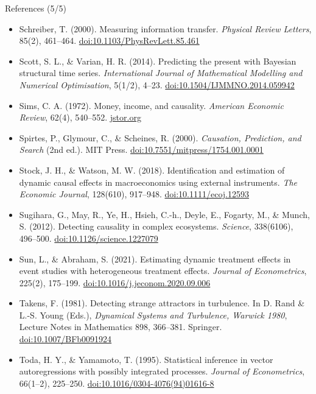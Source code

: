\begin{frame}{References (5/5)}
\itemsize{\tiny}
\begin{itemize}
    \item Schreiber, T. (2000). Measuring information transfer. \textit{Physical Review Letters}, 85(2), 461--464. \href{https://doi.org/10.1103/PhysRevLett.85.461}{doi:10.1103/PhysRevLett.85.461}
    \item Scott, S. L., \& Varian, H. R. (2014). Predicting the present with Bayesian structural time series. \textit{International Journal of Mathematical Modelling and Numerical Optimisation}, 5(1/2), 4--23. \href{https://doi.org/10.1504/IJMMNO.2014.059942}{doi:10.1504/IJMMNO.2014.059942}
    \item Sims, C. A. (1972). Money, income, and causality. \textit{American Economic Review}, 62(4), 540--552. \href{https://www.jstor.org/stable/1806097}{jstor.org}
    \item Spirtes, P., Glymour, C., \& Scheines, R. (2000). \textit{Causation, Prediction, and Search} (2nd ed.). MIT Press. \href{https://doi.org/10.7551/mitpress/1754.001.0001}{doi:10.7551/mitpress/1754.001.0001}
    \item Stock, J. H., \& Watson, M. W. (2018). Identification and estimation of dynamic causal effects in macroeconomics using external instruments. \textit{The Economic Journal}, 128(610), 917--948. \href{https://doi.org/10.1111/ecoj.12593}{doi:10.1111/ecoj.12593}
    \item Sugihara, G., May, R., Ye, H., Hsieh, C.-h., Deyle, E., Fogarty, M., \& Munch, S. (2012). Detecting causality in complex ecosystems. \textit{Science}, 338(6106), 496--500. \href{https://doi.org/10.1126/science.1227079}{doi:10.1126/science.1227079}
    \item Sun, L., \& Abraham, S. (2021). Estimating dynamic treatment effects in event studies with heterogeneous treatment effects. \textit{Journal of Econometrics}, 225(2), 175--199. \href{https://doi.org/10.1016/j.jeconom.2020.09.006}{doi:10.1016/j.jeconom.2020.09.006}
    \item Takens, F. (1981). Detecting strange attractors in turbulence. In D. Rand \& L.-S. Young (Eds.), \textit{Dynamical Systems and Turbulence, Warwick 1980}, Lecture Notes in Mathematics 898, 366--381. Springer. \href{https://doi.org/10.1007/BFb0091924}{doi:10.1007/BFb0091924}
    \item Toda, H. Y., \& Yamamoto, T. (1995). Statistical inference in vector autoregressions with possibly integrated processes. \textit{Journal of Econometrics}, 66(1--2), 225--250. \href{https://doi.org/10.1016/0304-4076(94)01616-8}{doi:10.1016/0304-4076(94)01616-8}

\end{itemize}
\end{frame}
